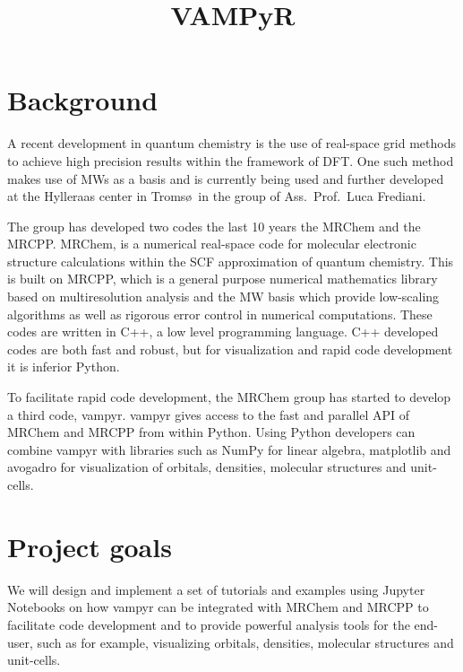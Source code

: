 \documentclass[12pt]{article}
\begin{document}
\title{VAMPyR}

\maketitle

\section{Background}

A recent development in quantum chemistry is the use of real-space grid
methods to achieve high precision results within the framework of
\ac{DFT}. One such method makes use of \acp{MW} as a
basis\cite{harrison2003multiresolution}
and is currently being used and further developed at the Hylleraas
center in Troms\o \, in the group of Ass.~Prof.~Luca Frediani\cite{frediani2013fully}.

The group has developed two codes the last 10 years the \ac{MRChem}\cite{mrchem} and
the \ac{MRCPP}\cite{mrcpp}.
\ac{MRChem}, is
a numerical real-space code for molecular electronic structure calculations
within the \ac{SCF} approximation of quantum chemistry. This is built on
\ac{MRCPP}, which is a general purpose numerical mathematics library
based on multiresolution analysis and the \ac{MW} basis which provide
low-scaling algorithms as well as rigorous error control in numerical
computations. These codes are written in C++, a low level programming language.
C++ developed codes are both fast and robust, but for visualization and
rapid code development it is inferior Python.

To facilitate rapid code development,
the \ac{MRChem} group has started to develop a third code,
\ac{vampyr}\cite{vampyr}. \ac{vampyr} gives access to the
fast and parallel \ac{API}
of \ac{MRChem} and \ac{MRCPP} from within Python. Using Python developers can
combine \ac{vampyr} with libraries such as NumPy for linear algebra, matplotlib\cite{matplotlib}
and avogadro\cite{avogadro} for visualization of orbitals, densities, molecular structures
and unit-cells.

\section{Project goals}

We will design and implement a set of tutorials and examples
using Jupyter Notebooks\cite{jupyter} on how
\ac{vampyr} can be integrated with \ac{MRChem} and \ac{MRCPP} to
facilitate code development and to provide powerful analysis tools for
the end-user, such as for example, visualizing orbitals, densities,
molecular structures and unit-cells.
\end{document}
